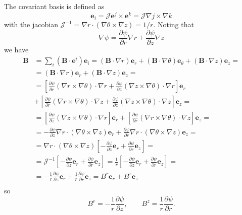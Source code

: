 The covariant basis is defined as
\begin{equation*}
  \mathbf{e}_i=\mathcal{J} \mathbf{e}^j\times\mathbf{e}^k=\mathcal{J} \nabla j\times\nabla k
\end{equation*}
with the jacobian $\mathcal{J}^{-1}=\nabla r \cdot(\nabla\theta\times\nabla z)=1/r$. Noting that
\begin{equation*}
  \nabla\psi=\frac{\partial\psi}{\partial r}\nabla r+\frac{\partial\psi}{\partial z}\nabla z
\end{equation*}
we have
\begin{equation*}
 \begin{split}
    \mathbf{B}&=\sum_i(\mathbf{B}\cdot\mathbf{e}^i)\mathbf{e}_i=(\mathbf{B}\cdot\nabla r)\mathbf{e}_r+(\mathbf{B}\cdot\nabla\theta)\mathbf{e}_\theta+(\mathbf{B}\cdot\nabla z)\mathbf{e}_z=\\
    &=(\mathbf{B}\cdot\nabla r)\mathbf{e}_r+(\mathbf{B}\cdot\nabla z)\mathbf{e}_z=\\
    &=\left[\frac{\partial\psi}{\partial r}(\nabla r \times\nabla\theta)\cdot\nabla r+\frac{\partial\psi}{\partial z}(\nabla z\times\nabla\theta)\cdot\nabla r\right]\mathbf{e}_r\\
    &+\left[\frac{\partial\psi}{\partial r}(\nabla r \times\nabla\theta)\cdot\nabla z+\frac{\partial\psi}{\partial z}(\nabla z\times\nabla\theta)\cdot\nabla z\right]\mathbf{e}_z=\\
    &=\left[\frac{\partial\psi}{\partial z}(\nabla z\times\nabla\theta)\cdot\nabla r\right]\mathbf{e}_r+\left[\frac{\partial\psi}{\partial r}(\nabla r \times\nabla\theta)\cdot\nabla z\right]\mathbf{e}_z=\\
    &=-\frac{\partial\psi}{\partial z}\nabla r\cdot(\nabla \theta\times\nabla z)\mathbf{e}_r+\frac{\partial\psi}{\partial r}\nabla r\cdot(\nabla \theta\times\nabla z)\mathbf{e}_z=\\
    &=\nabla r\cdot(\nabla \theta\times\nabla z)\left[-\frac{\partial\psi}{\partial z}\mathbf{e}_r+\frac{\partial\psi}{\partial r}\mathbf{e}_z\right]=\\
    &=\mathcal{J}^{-1}\left[-\frac{\partial\psi}{\partial z}\mathbf{e}_r+\frac{\partial\psi}{\partial r}\mathbf{e}_z\right]=\frac{1}{r}\left[-\frac{\partial\psi}{\partial z}\mathbf{e}_r+\frac{\partial\psi}{\partial r}\mathbf{e}_z\right]=\\
    &=-\frac{1}{r}\frac{\partial\psi}{\partial z}\mathbf{e}_r+\frac{1}{r}\frac{\partial\psi}{\partial r}\mathbf{e}_z=B^r\mathbf{e}_r+B^z\mathbf{e}_z\\
  \end{split}
\end{equation*}
so
\begin{equation*}
  B^r=-\frac{1}{r}\frac{\partial\psi}{\partial z},\qquad B^z=\frac{1}{r}\frac{\partial\psi}{\partial r}.
\end{equation*}

